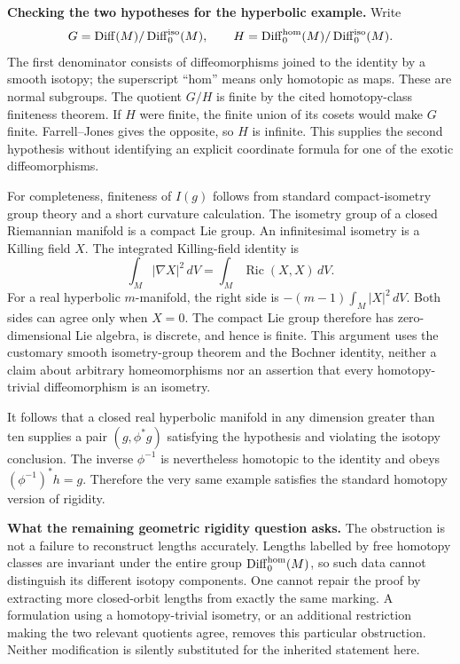\documentclass[11pt]{article}
\begin{document}
\textbf{Checking the two hypotheses for the hyperbolic example.}
Write
\[
 G=\operatorname{Diff}(M)/\operatorname{Diff}^{\rm iso}_0(M),\qquad
 H=\operatorname{Diff}^{\rm hom}_0(M)/\operatorname{Diff}^{\rm iso}_0(M).
\]
The first denominator consists of diffeomorphisms joined to the identity by a
smooth isotopy; the superscript ``hom'' means only homotopic as maps.
These are normal subgroups.  The quotient $G/H$ is finite by the cited
homotopy-class finiteness theorem.  If $H$ were finite, the finite union of its
cosets would make $G$ finite.  Farrell--Jones gives the opposite, so $H$ is
infinite.  This supplies the second hypothesis without identifying an explicit
coordinate formula for one of the exotic diffeomorphisms.

For completeness, finiteness of $I(g)$ follows from standard compact-isometry
group theory and a short curvature calculation.  The isometry group of a
closed Riemannian manifold is a compact Lie group.  An infinitesimal isometry
is a Killing field $X$.  The integrated Killing-field identity is
\[
 \int_M|\nabla X|^2\,dV=\int_M\operatorname{Ric}(X,X)\,dV.
\]
For a real hyperbolic $m$-manifold, the right side is
$-(m-1)\int_M|X|^2\,dV$.  Both sides can agree only when $X=0$.
The compact Lie group therefore has zero-dimensional Lie algebra, is discrete,
and hence is finite.  This argument uses the customary smooth isometry-group
theorem and the Bochner identity, neither a claim about arbitrary homeomorphisms
nor an assertion that every homotopy-trivial diffeomorphism is an isometry.

It follows that a closed real hyperbolic manifold in any dimension greater
than ten supplies a pair $(g,\phi^*g)$ satisfying the hypothesis and violating
the isotopy conclusion.  The inverse $\phi^{-1}$ is nevertheless homotopic to
the identity and obeys $(\phi^{-1})^*h=g$.  Therefore the very same example
satisfies the standard homotopy version of rigidity.

\textbf{What the remaining geometric rigidity question asks.}
The obstruction is not a failure to reconstruct lengths accurately.  Lengths
labelled by free homotopy classes are invariant under the entire group
$\operatorname{Diff}^{\rm hom}_0(M)$, so such data cannot distinguish its
different isotopy components.  One cannot repair the proof by extracting more
closed-orbit lengths from exactly the same marking.  A formulation using a
homotopy-trivial isometry, or an additional restriction making the two relevant
quotients agree, removes this particular obstruction.  Neither modification
is silently substituted for the inherited statement here.
\end{document}
